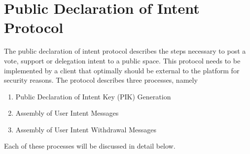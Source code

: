 %
%
%
%
%


\section{Public Declaration of Intent Protocol}
\label{sec:PublicDeclarationOfIntentProtocol}
The public declaration of intent protocol describes the steps necessary to post a vote, support or delegation intent to a public space.
This protocol needs to be implemented by a client that optimally should be external to the platform for security reasons.
The protocol describes three processes, namely
\begin{enumerate}
  \item Public Declaration of Intent Key (PIK) Generation
  \item Assembly of User Intent Messages
  \item Assembly of User Intent Withdrawal Messages
\end{enumerate}

Each of these processes will be discussed in detail below.



